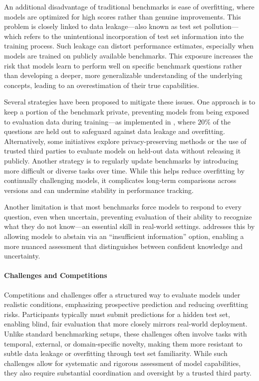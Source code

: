 An additional disadvantage of traditional benchmarks is ease of overfitting, where models are optimized for high scores rather than genuine improvements. 
This problem is closely linked to data leakage---also known as test set pollution---which refers to the unintentional incorporation of test set information into the training process. Such leakage can distort performance estimates, especially when models are trained on publicly available benchmarks.\autocite{thompson2025chatbots}
This exposure increases the risk that models learn to perform well on specific benchmark questions rather than developing a deeper, more generalizable understanding of the underlying concepts, leading to an overestimation of their true capabilities. 

Several strategies have been proposed to mitigate these issues. One approach is to keep a portion of the benchmark private, preventing models from being exposed to evaluation data during training---as implemented in , where $20\%$ of the questions are held out to safeguard against data leakage and overfitting.\autocite{laurent2024lab0bench0} 
Alternatively, some initiatives explore privacy-preserving methods or the use of trusted third parties to evaluate models on held-out data without releasing it publicly. \autocite{eleutherai2024thirdparty}
Another strategy is to regularly update benchmarks by introducing more difficult or diverse tasks over time. \autocite{jimenez2023swe} 
While this helps reduce overfitting by continually challenging models, it complicates long-term comparisons across versions and can undermine stability in performance tracking. \autocite{alampara2025lessons}

Another limitation is that most benchmarks force models to respond to every question, even when uncertain, preventing evaluation of their ability to recognize what they do not know---an essential skill in real-world settings.  addresses this by allowing models to abstain via an \enquote{insufficient information} option, enabling a more nuanced assessment that distinguishes between confident knowledge and uncertainty.


\paragraph{Challenges and Competitions}
Competitions and challenges offer a structured way to evaluate models under realistic conditions, emphasizing prospective prediction and reducing overfitting risks.\autocite{Moult2005} 
Participants typically must submit predictions for a hidden test set, enabling blind, fair evaluation that more closely mirrors real-world deployment. Unlike standard benchmarking setups, these challenges often involve tasks with temporal, external, or domain-specific novelty, making them more resistant to subtle data leakage or overfitting through test set familiarity. 
While such challenges allow for systematic and rigorous assessment of model capabilities, they also require substantial coordination and oversight by a trusted third party.

